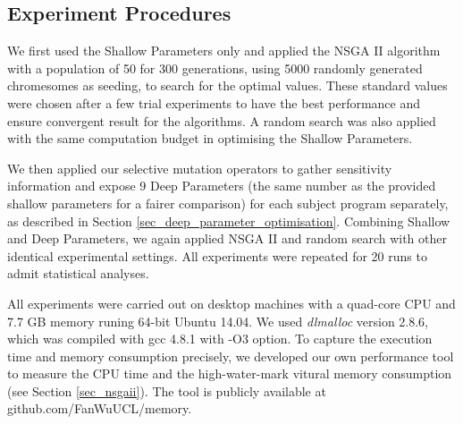 \subsection{Experiment Procedures}

We first used the Shallow Parameters only and applied the NSGA II algorithm
with a population of 50 for 300 generations, using 5000 randomly generated
chromesomes as seeding, to search for the optimal values. 
These standard values were chosen after a few trial experiments to have the best performance and ensure convergent result for the algorithms. 
A random search was also applied with the same computation budget in optimising the Shallow Parameters. 

We then applied our selective mutation operators to gather sensitivity information and expose 9 Deep Parameters (the same number as the provided shallow parameters for a fairer comparison) for each subject program separately, as described in Section \ref{sec_deep_parameter_optimisation}. Combining Shallow and Deep Parameters, we again applied NSGA II and random search with other identical experimental settings. All experiments were repeated for 20 runs to admit statistical analyses. 

All experiments were carried out on desktop machines with a quad-core CPU and 7.7 GB memory runing 64-bit Ubuntu 14.04. We used \emph{dlmalloc} version 2.8.6, which was compiled with gcc 4.8.1 with -O3 option. To capture the execution time and memory consumption precisely, we developed our own performance tool to measure the CPU time and the high-water-mark vitural memory consumption (see Section \ref{sec_nsgaii}). The tool is publicly available at github.com/FanWuUCL/memory.

